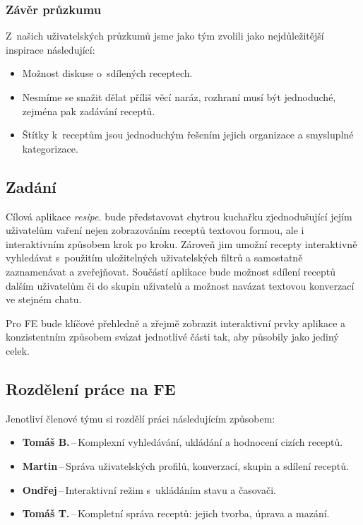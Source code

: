 \documentclass[a4paper, 11pt]{article}
\newcommand{\sss}[1]{\subsubsection{#1}} %
\begin{document}
    \newpage

    \sss{Závěr průzkumu}\label{app_sum}

    Z~našich uživatelských průzkumů jsme jako tým zvolili jako nej\-dů\-le\-ži\-těj\-ší inspirace následující:
    \begin{itemize}
        \item Možnost diskuse o~sdílených receptech.
        \item Nesmíme se snažit dělat příliš věcí naráz, rozhraní musí být jednoduché,
        zejména pak zadávání receptů.
        \item Štítky k~receptům jsou jednoduchým řešením jejich organizace a smysluplné kategorizace.
    \end{itemize}


    \subsection{Zadání}

    Cílová aplikace \emph{resipe.} bude představovat chytrou kuchařku zjednodušující jejím uživatelům vaření
    nejen zobrazováním receptů textovou formou, ale i interaktivním způsobem krok po kroku. Zároveň jim
    umožní recepty interaktivně vyhledávat s~použitím uložitelných uživatelských filtrů a samostatně
    zaznamenávat a zveřejňovat. Součástí aplikace bude možnost sdílení receptů dalším uživatelům či do
    skupin uživatelů a možnost navázat textovou konverzací ve stejném chatu.

    Pro FE bude klíčové přehledně a zřejmě zobrazit interaktivní prvky aplikace a konzistentním
    způsobem svázat jednotlivé části tak, aby působily jako jediný celek.

    \subsection{Rozdělení práce na FE}

    Jenotliví členové týmu si rozdělí práci následujícím způsobem:
    \begin{itemize}
        \item \textbf{Tomáš B.}\,--\,Komplexní vyhledávání, ukládání a hodnocení cizích receptů.
        \item \textbf{Martin}\,--\,Správa uživatelských profilů, konverzací, skupin a sdílení receptů.
        \item \textbf{Ondřej}\,--\,Interaktivní režim s~ukládáním stavu a časovači.
        \item \textbf{Tomáš T.}\,--\,Kompletní správa receptů: jejich tvorba, úprava a mazání.
    \end{itemize}
\end{document}
